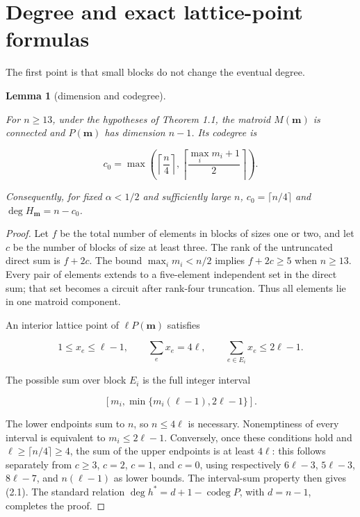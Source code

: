 \documentclass[11pt]{article}
\newtheorem{lemma}[theorem]{Lemma}
\begin{document}
\section{Degree and exact lattice-point formulas}


The first point is that small blocks do not change the eventual degree.

\Needspace{0.16\textheight}
\begin{lemma}[dimension and codegree]
\label{lemma:2-1}

For $n\ge13$, under the hypotheses of Theorem 1.1, the matroid
$M(\mathbf m)$ is connected and $P(\mathbf m)$ has dimension $n-1$.  Its
codegree is

\[
  c_0=\max\left(
    \left\lceil\frac n4\right\rceil,
    \left\lceil\frac{\max_i m_i+1}{2}\right\rceil
  \right). \tag{2.1}
\]

Consequently, for fixed $\alpha<1/2$ and sufficiently large $n$,
$c_0=\lceil n/4\rceil$ and $\deg H_{\mathbf m}=n-c_0$.

\end{lemma}

\begin{proof}


Let $f$ be the total number of elements in blocks of sizes one or two, and let
$c$ be the number of blocks of size at least three.  The rank of the untruncated
direct sum is $f+2c$.  The bound $\max_i m_i<n/2$ implies $f+2c\ge5$
when $n\ge13$.  Every pair of elements extends to a five-element independent
set in the direct sum; that set becomes a circuit after rank-four truncation.
Thus all elements lie in one matroid component.

An interior lattice point of $\ell P(\mathbf m)$ satisfies

\[
1\le x_e\le\ell-1,\qquad
\sum_e x_e=4\ell,\qquad
\sum_{e\in E_i}x_e\le2\ell-1. \tag{2.2}
\]

The possible sum over block $E_i$ is the full integer interval

\[
\left[m_i,\min\{m_i(\ell-1),2\ell-1\}\right]. \tag{2.3}
\]

The lower endpoints sum to $n$, so $n\le4\ell$ is necessary.  Nonemptiness
of every interval is equivalent to $m_i\le2\ell-1$.  Conversely, once these
conditions hold and $\ell\ge\lceil n/4\rceil\ge4$, the sum of the upper
endpoints is at least $4\ell$: this follows separately from
$c\ge3$, $c=2$, $c=1$, and $c=0$, using respectively
$6\ell-3$, $5\ell-3$, $8\ell-7$, and $n(\ell-1)$ as lower bounds.
The interval-sum property then gives (2.1).  The standard relation
$\deg h^*=d+1-\operatorname{codeg}P$, with $d=n-1$, completes the proof.
\end{proof}
\end{document}
